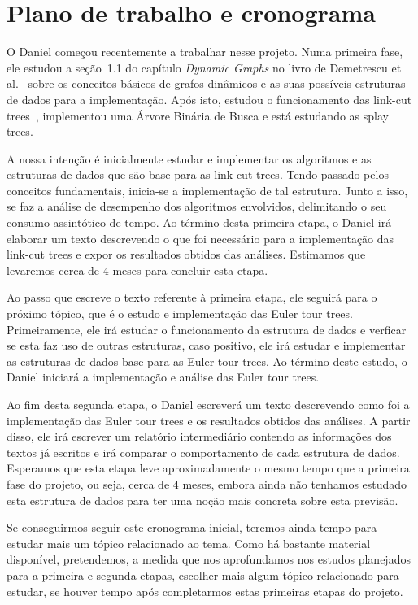 \documentclass[12pt]{article}
\begin{document}
\section{Plano de trabalho e cronograma}  

O Daniel começou recentemente a trabalhar nesse projeto. Numa primeira
fase, ele estudou a seção~1.1 do capítulo \emph{Dynamic Graphs} no livro de 
Demetrescu et al.~\cite{DemetrescuFI2004} sobre os conceitos básicos de grafos 
dinâmicos e as suas possíveis estruturas de dados para a implementação. 
Após isto, estudou o funcionamento das link-cut trees~\cite{DemaineHJSI2012}, 
implementou uma Árvore Binária de Busca e está estudando as splay trees.

A nossa intenção é
inicialmente estudar e implementar os algoritmos e as estruturas de dados que são base para as link-cut trees. 
Tendo passado pelos conceitos fundamentais, inicia-se a implementação de tal estrutura.
Junto a isso, se faz a análise de desempenho dos algoritmos envolvidos, 
delimitando o seu consumo assintótico de tempo.
Ao término desta primeira etapa, o Daniel irá elaborar um texto descrevendo o que foi necessário para a implementação das link-cut trees e expor os resultados obtidos das análises.
Estimamos que levaremos cerca de 4 meses para concluir esta etapa. 

Ao passo que escreve o texto referente à primeira etapa, ele seguirá para o próximo tópico, que é o estudo e implementação das Euler tour trees. Primeiramente, ele irá estudar o funcionamento da estrutura de dados e verficar se esta faz uso de outras estruturas, caso positivo, ele irá estudar e implementar as estruturas de dados base para as Euler tour trees. Ao término deste estudo, o Daniel iniciará a implementação e análise das Euler tour trees. 

Ao fim desta segunda etapa, o Daniel escreverá um texto descrevendo como foi a implementação das Euler tour trees e os resultados obtidos das análises. A partir disso, ele irá escrever um relatório intermediário contendo as informações dos textos já escritos e irá comparar o comportamento de cada estrutura de dados.  Esperamos que esta etapa leve aproximadamente o mesmo tempo que a primeira fase do projeto, ou seja, cerca de 4 meses, embora ainda não tenhamos estudado esta estrutura de dados para ter uma noção mais concreta sobre esta previsão.  

Se conseguirmos seguir este cronograma inicial, teremos ainda tempo para estudar mais um tópico relacionado ao tema.  Como há bastante material disponível, pretendemos, a medida que nos aprofundamos nos estudos planejados para a primeira e segunda etapas, escolher mais algum tópico relacionado para estudar, se houver tempo após completarmos estas primeiras etapas do projeto.
\end{document}
